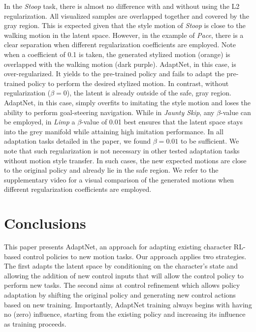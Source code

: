 In the \textit{Stoop} task, there is almost no difference with and without using the L2 regularization.
All visualized samples are overlapped together and covered by the gray region. This is expected 
given that the style motion of \textit{Stoop} is close to the walking motion in the latent space.
However, in the example of \textit{Pace}, there is a clear separation when different regularization coefficients are employed.
Note when a coefficient of 0.1 is taken, the generated stylized motion (orange) is overlapped with the walking motion (dark purple).
AdaptNet, in this case, is over-regularized.
It yields to the pre-trained policy and fails to adapt the pre-trained policy to perform the desired stylized motion.
In contrast, without regularization ($\beta=0$), the latent is already outside of the safe, gray region. 
AdaptNet, in this case, simply overfits to imitating the style motion and loses the ability to perform goal-steering navigation. 
While in \emph{Jaunty Skip}, any $\beta$-value can be employed, in \emph{Limp} a $\beta$-value of 0.01 best ensures that the latent space stays into the grey manifold while attaining high imitation performance. In all adaptation tasks detailed in the paper, we found $\beta = 0.01$ to be sufficient.
We note that such regularization is not necessary in other tested adaptation tasks without motion style transfer. In such cases, the new expected motions are close to the original policy and already lie in the safe region.
We refer 
to the supplementary video for a visual comparison of the generated motions when different regularization coefficients are employed. %






\section{Conclusions} 
\label{sec:conclusions}



This paper presents AdaptNet, an approach for adapting existing character RL-based control policies to new motion tasks.  Our approach applies two strategies. The first adapts the latent space by conditioning on the character's state and allowing the addition of new control inputs that will allow the control policy to perform new tasks. The second aims at control refinement which allows policy adaptation %
by shifting the original policy and generating new control actions based on new training.  
Importantly, AdaptNet training always begins 
with
having no (zero) influence, starting from the existing policy and increasing its %
influence as training proceeds. 

